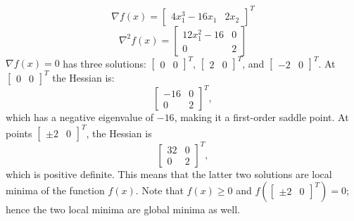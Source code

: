\documentclass[11pt]{article}
\begin{document}
\section{}
\subsection{}
$$\nabla f(x)=\begin{bmatrix}4x_1^3-16x_1 & 2x_2\end{bmatrix}^T$$
$$\nabla^2 f(x)=\begin{bmatrix}12x_1^2-16&0\\0&2\end{bmatrix}$$
$\nabla f(x)=0$ has three solutions: $\begin{bmatrix}0&0\end{bmatrix}^T$, $\begin{bmatrix}2&0\end{bmatrix}^T$, and $\begin{bmatrix}-2&0\end{bmatrix}^T$. At $\begin{bmatrix}0&0\end{bmatrix}^T$ the Hessian is:$$\begin{bmatrix}-16&0\\0&2\end{bmatrix}^T,$$ which has a negative eigenvalue of $-16$, making it a first-order saddle point. At points $\begin{bmatrix}\pm2&0\end{bmatrix}^T$, the Hessian is $$\begin{bmatrix}32&0\\0&2\end{bmatrix}^T,$$ which is positive definite. This means that the latter two solutions are local minima of the function $f(x)$. Note that $f(x)\geq0$ and $f(\begin{bmatrix}\pm2&0\end{bmatrix}^T)=0$; hence the two local minima are global minima as well.
\end{document}
